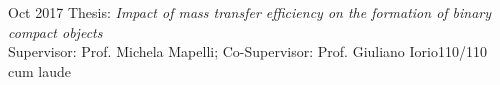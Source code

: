 \begin{experiences}
    {Oct 2017} 
    {Thesis: \textit{Impact of mass transfer efficiency on the formation of binary compact objects} \\
    Supervisor: Prof. Michela Mapelli; Co-Supervisor: Prof. Giuliano Iorio}{110/110 cum laude}
   {}%
\end{experiences}
